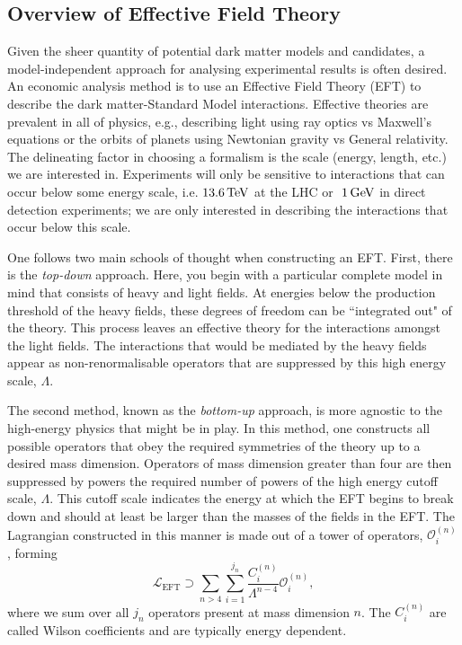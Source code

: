 \subsection{Overview of Effective Field Theory}
Given the sheer quantity of potential dark matter models and candidates, a model-independent approach for analysing experimental results is often desired. An economic analysis method is to use an Effective Field Theory (EFT) to describe the dark matter-Standard Model interactions. Effective theories are prevalent in all of physics, e.g., describing light using ray optics vs Maxwell's equations or the orbits of planets using Newtonian gravity vs General relativity. The delineating factor in choosing a formalism is the scale (energy, length, etc.) we are interested in. 
Experiments will only be sensitive to interactions that can occur below some energy scale, i.e. $13.6{\rm \,TeV}$ at the LHC or $~1{\rm \,GeV}$ in direct detection experiments; we are only interested in describing the interactions that occur below this scale.

One follows two main schools of thought when constructing an EFT. First, there is the \textit{top-down} approach. Here, you begin with a particular complete model in mind that consists of heavy and light fields. At energies below the production threshold of the heavy fields, these degrees of freedom can be ``integrated out" of the theory. This process leaves an effective theory for the interactions amongst the light fields. The interactions that would be mediated by the heavy fields appear as non-renormalisable operators that are suppressed by this high energy scale, $\Lambda$. 

The second method, known as the \textit{bottom-up} approach, is more agnostic to the high-energy physics that might be in play. In this method, one constructs all possible operators that obey the required symmetries of the theory up to a desired mass dimension. Operators of mass dimension greater than four are then suppressed by powers the required number of powers of the high energy cutoff scale, $\Lambda$. This cutoff scale indicates the energy at which the EFT begins to break down and should at least be larger than the masses of the fields in the EFT. The Lagrangian constructed in this manner is made out of a tower of operators, $\mathcal{O}_i^{(n)}$, forming
\begin{equation}
    \mathcal{L}_\mathrm{EFT} \supset \sum_{n>4}   \sum_{i = 1}^{j_n} \frac{C_i^{(n)}}{\Lambda^{n-4}}\mathcal{O}_i^{(n)},
\end{equation}
where we sum over all $j_n$ operators present at mass dimension $n$. The $C_i^{(n)}$ are called Wilson coefficients and are typically energy dependent.


